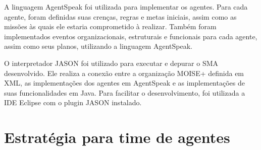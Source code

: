 \documentclass{llncs}
\begin{document}
A linguagem AgentSpeak foi utilizada para implementar os agentes. Para cada agente, foram definidas suas crenças, regras e metas iniciais, assim como as missões às quais ele estaria comprometido à realizar. Também foram implementados eventos organizacionais, estruturais e funcionais para cada agente, assim como seus planos, utilizando a linguagem AgentSpeak.

O interpretador JASON foi utilizado para executar e depurar o SMA desenvolvido. Ele realiza a conexão entre a organização MOISE+ definida em XML, as implementações dos agentes em AgentSpeak e as implementações de suas funcionalidades em Java. Para facilitar o desenvolvimento, foi utilizada a IDE Eclipse com o plugin JASON instalado.


\section{Estratégia para time de agentes}


\end{document}
